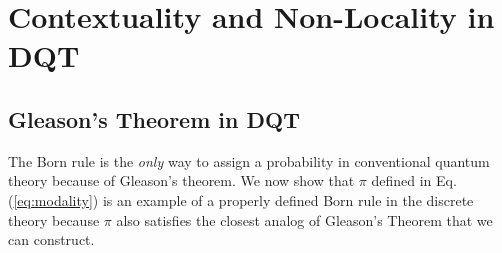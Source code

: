 \documentclass[english,12pt]{iopart}
\newcommand{\dpr}{{\pi}}
\begin{document}
\section{Contextuality and Non-Locality in DQT}

\subsection{Gleason's Theorem in DQT} The Born rule is the \emph{only}
way to assign a probability in conventional quantum theory because of
Gleason's theorem.  We now show that $\dpr $ defined in
Eq. (\ref{eq:modality}) is an example of a properly defined Born rule
in the discrete theory because $\dpr $ also satisfies the closest
analog of Gleason's Theorem that we can construct.
\end{document}

